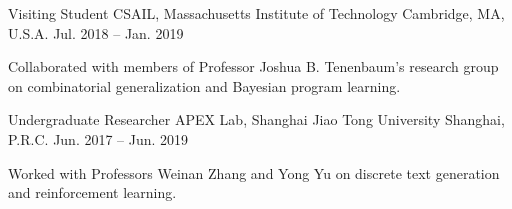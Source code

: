 \begin{cventries}
  \cventry
    {Visiting Student}
    {CSAIL, Massachusetts Institute of Technology}
    {Cambridge, MA, U.S.A.}
    {Jul. 2018 -- Jan. 2019}
    {
      \begin{cvitems}
        \item {Collaborated with members of Professor Joshua B. Tenenbaum's research group on combinatorial generalization and Bayesian program learning.}
      \end{cvitems}
    }

  \cventry
    {Undergraduate Researcher}
    {APEX Lab, Shanghai Jiao Tong University}
    {Shanghai, P.R.C.}
    {Jun. 2017 -- Jun. 2019}
    {
      \begin{cvitems}
        \item {Worked with Professors Weinan Zhang and Yong Yu on discrete text generation and reinforcement learning.}
      \end{cvitems}
    }
\end{cventries}
